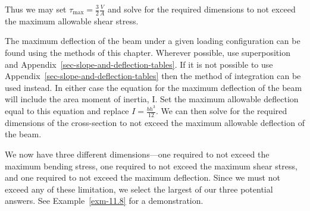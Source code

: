 \documentclass[
  letterpaper,
  DIV=11,
  numbers=noendperiod]{scrreprt}
\theoremstyle{definition}
\theoremstyle{remark}
\begin{document}
Thus we may set \(\tau_{\max }=\frac{3}{2} \frac{V}{A}\) and solve for
the required dimensions to not exceed the maximum allowable shear
stress.

The maximum deflection of the beam under a given loading configuration
can be found using the methods of this chapter. Wherever possible, use
superposition and Appendix~\ref{sec-slope-and-deflection-tables}. If it
is not possible to use Appendix~\ref{sec-slope-and-deflection-tables}
then the method of integration can be used instead. In either case the
equation for the maximum deflection of the beam will include the area
moment of inertia, I. Set the maximum allowable deflection equal to this
equation and replace \(I=\frac{b h^{3}}{12}\). We can then solve for the
required dimensions of the cross-section to not exceed the maximum
allowable deflection of the beam.

We now have three different dimensions---one required to not exceed the
maximum bending stress, one required to not exceed the maximum shear
stress, and one required to not exceed the maximum deflection. Since we
must not exceed any of these limitation, we select the largest of our
three potential answers. See Example~\ref{exm-11.8} for a demonstration.
\end{document}
